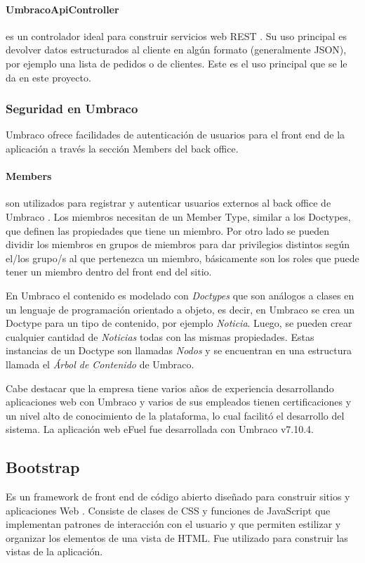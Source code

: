    \paragraph{UmbracoApiController} es un controlador ideal para construir servicios web REST \cite{apiController}. Su uso principal es devolver datos estructurados al cliente en algún formato (generalmente JSON), por ejemplo una lista de pedidos o de clientes. Este es el uso principal que se le da en este proyecto.

    \subsubsection{Seguridad en Umbraco}
    Umbraco ofrece facilidades de autenticación de usuarios para el front end de la aplicación a través la sección Members del back office.
    \paragraph{Members} son utilizados para registrar y autenticar usuarios externos al back office de Umbraco \cite{membersUmbraco}. Los miembros necesitan de un Member Type, similar a los Doctypes, que definen las propiedades que tiene un miembro. Por otro lado se pueden dividir los miembros en grupos de miembros para dar privilegios distintos según el/los grupo/s al que pertenezca un miembro, básicamente son los roles que puede tener un miembro dentro del front end del sitio.

    En Umbraco el contenido es modelado con \emph{Doctypes} que son análogos a clases en un lenguaje de programación orientado a objeto, es decir, en Umbraco se crea un Doctype para un tipo de contenido, por ejemplo \emph{Noticia}. Luego, se pueden crear cualquier cantidad de \emph{Noticias} todas con las mismas propiedades. Estas instancias de un Doctype son llamadas \emph{Nodos} y se encuentran en una estructura llamada el \emph{Árbol de Contenido} de Umbraco.

    Cabe destacar que la empresa tiene varios años de experiencia desarrollando aplicaciones web con Umbraco y varios de sus empleados tienen certificaciones y un nivel alto de conocimiento de la plataforma, lo cual facilitó el desarrollo del sistema. La aplicación web eFuel fue desarrollada con Umbraco v7.10.4.

    \subsection{Bootstrap}
    Es un framework de front end de código abierto diseñado para construir sitios y aplicaciones Web \cite{bootstrapAbout}. Consiste de clases de CSS y funciones de JavaScript que implementan patrones de interacción con el usuario y que permiten estilizar y organizar los elementos de una vista de HTML. Fue utilizado para construir las vistas de la aplicación.

